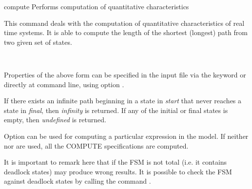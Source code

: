 \begin{nusmvCommand}{compute} {Performs computation of quantitative characteristics}


This command deals with the computation of quantitative
characteristics of real time systems. It is able to compute the length
of the shortest (longest) path from two given set of states.
\begin{center}
 \\
\end{center}
Properties of the above form can be specified in the input file via
the keyword  or directly at command line, using option
.

If there exists an infinite path beginning in a state in
\textit{start} that never reaches a state in \textit{final}, then
\textit{infinity} is returned. If any of the initial or final states 
is empty, then \textit{undefined} is returned.

Option  can be used for computing a particular
expression in the model. If neither  nor 
are used, all the COMPUTE specifications are computed.

It is important to remark here that if the FSM is not total (i.e. it
contains deadlock states)  may produce wrong
results. It is possible to check the FSM against deadlock states by
calling the command .

\begin{cmdOpt}





\end{cmdOpt}
\end{nusmvCommand}
